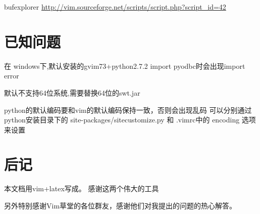 \documentclass[oneside,openany]{book}
\begin{document}
  bufexplorer
  \href{http://vim.sourceforge.net/scripts/script.php?script\_id=42}
   {http://vim.sourceforge.net/scripts/script.php?script\_id=42}

\chapter{已知问题}


    在 windows下,默认安装的gvim73+python2.7.2 import pyodbc时会出现import error 

    默认不支持64位系统,需要替换64位的swt.jar 

    python的默认编码要和vim的默认编码保持一致，否则会出现乱码 可以分别通过 python安装目录下的
    site-packages/sitecustomize.py 和 .vimrc中的 encoding 选项来设置 

\chapter{后记}
   本文档用vim+latex写成。 感谢这两个伟大的工具

   另外特别感谢Vim草堂的各位群友，感谢他们对我提出的问题的热心解答。
   
   
\end{document}

